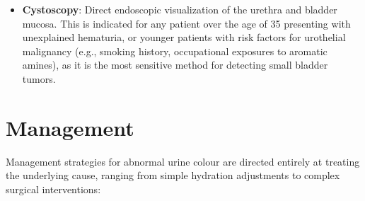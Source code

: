 \begin{itemize}
  \item \textbf{Cystoscopy}: Direct endoscopic visualization of the urethra and bladder mucosa. This is indicated for any patient over the age of 35 presenting with unexplained hematuria, or younger patients with risk factors for urothelial malignancy (e.g., smoking history, occupational exposures to aromatic amines), as it is the most sensitive method for detecting small bladder tumors.
\end{itemize}

\section*{Management}
Management strategies for abnormal urine colour are directed entirely at treating the underlying cause, ranging from simple hydration adjustments to complex surgical interventions:

